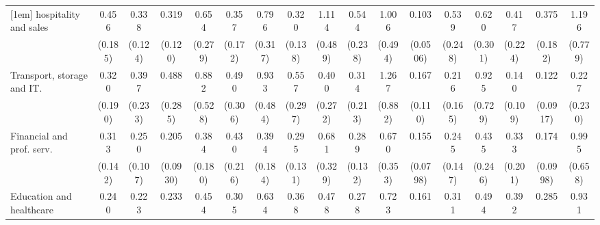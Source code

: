 {\begin{tabular}{l*{16}{c}}
[1em]
hospitality and sales&       0.456         &       0.338\sym{**} &       0.319\sym{**} &       0.654         &       0.357\sym{*}  &       0.796         &       0.320\sym{**} &       1.114         &       0.544         &       1.006         &       0.103\sym{***}&       0.539         &       0.620         &       0.417         &       0.375\sym{*}  &       1.196         \\
                    &     (0.185)         &     (0.124)         &     (0.120)         &     (0.279)         &     (0.172)         &     (0.317)         &     (0.138)         &     (0.489)         &     (0.238)         &     (0.494)         &    (0.0506)         &     (0.248)         &     (0.301)         &     (0.224)         &     (0.182)         &     (0.779)         \\
[1em]
Transport, storage and IT.&       0.320         &       0.397         &       0.488         &       0.882         &       0.490         &       0.933         &       0.557         &       0.400         &       0.314         &       1.267         &       0.167\sym{**} &       0.216\sym{*}  &       0.925         &       0.140\sym{*}  &       0.122\sym{**} &       0.227         \\
                    &     (0.190)         &     (0.233)         &     (0.285)         &     (0.528)         &     (0.306)         &     (0.484)         &     (0.297)         &     (0.272)         &     (0.213)         &     (0.882)         &     (0.110)         &     (0.165)         &     (0.729)         &     (0.109)         &    (0.0917)         &     (0.230)         \\
[1em]
Financial and prof. serv.&       0.313\sym{*}  &       0.250\sym{**} &       0.205\sym{***}&       0.384\sym{*}  &       0.430         &       0.394\sym{*}  &       0.295\sym{**} &       0.681         &       0.289\sym{**} &       0.670         &       0.155\sym{***}&       0.245\sym{*}  &       0.435         &       0.333         &       0.174\sym{**} &       0.995         \\
                    &     (0.142)         &     (0.107)         &    (0.0930)         &     (0.180)         &     (0.216)         &     (0.184)         &     (0.131)         &     (0.329)         &     (0.132)         &     (0.353)         &    (0.0798)         &     (0.147)         &     (0.246)         &     (0.201)         &    (0.0998)         &     (0.658)         \\
[1em]
Education and healthcare&       0.240\sym{**} &       0.223\sym{***}&       0.233\sym{***}&       0.454         &       0.305\sym{*}  &       0.634         &       0.368\sym{*}  &       0.478         &       0.278\sym{**} &       0.723         &       0.161\sym{***}&       0.311\sym{*}  &       0.494         &       0.392         &       0.285\sym{*}  &       0.931         \\

\end{tabular}}
